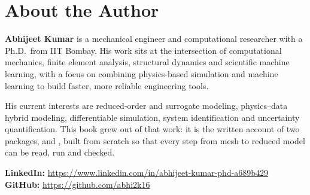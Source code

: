 \chapter*{About the Author}
\thispagestyle{plain}

\textbf{Abhijeet Kumar} is a mechanical engineer and computational researcher with a Ph.D.\ from IIT Bombay. His work sits at the intersection of computational mechanics, finite element analysis, structural dynamics and scientific machine learning, with a focus on combining physics-based simulation and machine learning to build faster, more reliable engineering tools.

His current interests are reduced-order and surrogate modeling, physics--data hybrid modeling, differentiable simulation, system identification and uncertainty quantification. This book grew out of that work: it is the written account of two packages, \fea{} and \rom{}, built from scratch so that every step from mesh to reduced model can be read, run and checked.

\medskip
\noindent\textbf{LinkedIn:} \url{https://www.linkedin.com/in/abhijeet-kumar-phd-a689b429}\\
\textbf{GitHub:} \url{https://github.com/abhi2k16}
